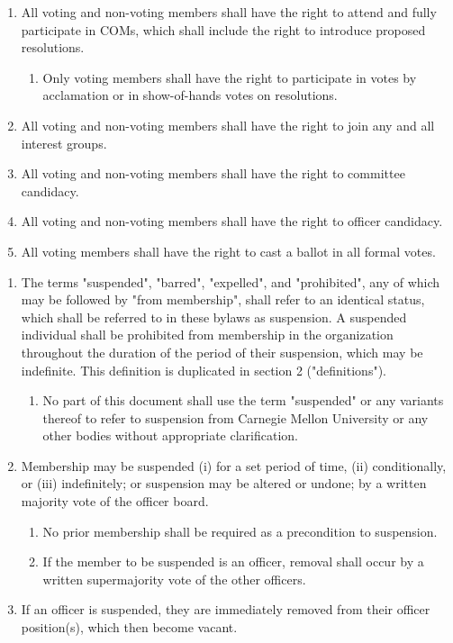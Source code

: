 \documentclass[11pt]{article}
\newcounter{h1}
\newcounter{h2}[h1]
\newcounter{h3}[h2]
\begin{document}
\begin{enumerate}
  \item All voting and non-voting members shall have the right to attend and fully participate in COMs, which shall include the right to introduce proposed resolutions.  
  \begin{enumerate}
    \item Only voting members shall have the right to participate in votes by acclamation or in show-of-hands votes on resolutions.  
  \end{enumerate}
  \item All voting and non-voting members shall have the right to join any and all interest groups.  
  \item All voting and non-voting members shall have the right to committee candidacy.  
  \item All voting and non-voting members shall have the right to officer candidacy.  
  \item All voting members shall have the right to cast a ballot in all formal votes.
\end{enumerate}


\begin{enumerate}
  \item The terms "suspended", "barred", "expelled", and "prohibited", any of which may be followed by "from membership", shall refer to an identical status, which shall be referred to in these bylaws as suspension. A suspended individual shall be prohibited from membership in the organization throughout the duration of the period of their suspension, which may be indefinite. This definition is duplicated in section 2 ("definitions").  
  \begin{enumerate}
    \item No part of this document shall use the term "suspended" or any variants thereof to refer to suspension from Carnegie Mellon University or any other bodies without appropriate clarification.  
  \end{enumerate}
  \item Membership may be suspended (i) for a set period of time, (ii) conditionally, or (iii) indefinitely; or suspension may be altered or undone; by a written majority vote of the officer board.  
  \begin{enumerate}
    \item No prior membership shall be required as a precondition to suspension.  
    \item If the member to be suspended is an officer, removal shall occur by a written supermajority vote of the other officers.  
  \end{enumerate}
  \item If an officer is suspended, they are immediately removed from their officer position(s), which then become vacant.
\end{enumerate}
\end{document}
